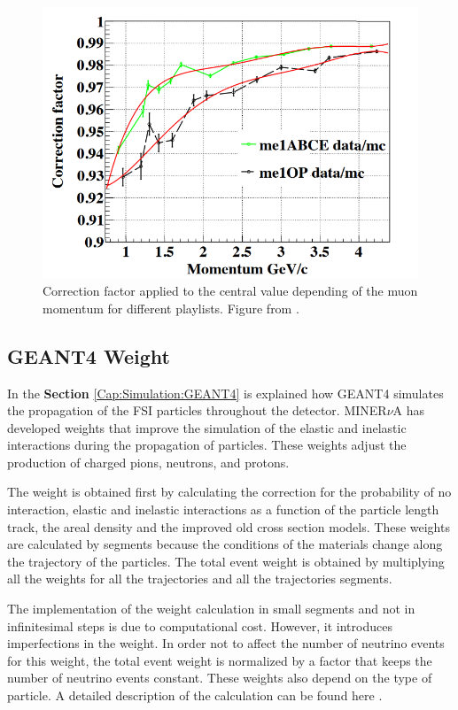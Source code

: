 \begin{figure}
    \centering
    \includegraphics[scale=0.4]{Figures/Chapter3/MINOSEfficiencyWeight.png}
    \caption{Correction factor applied to the central value depending of the muon momentum for different playlists. Figure from \cite{MINOSEffWeight}.}
    \label{fig:Chapter3:MINOSEfficiencyWeight}
\end{figure}

\subsection{GEANT4 Weight}
\label{Cap:Simulation:MnvGENIETunes:Geant4Weight}
In the \textbf{Section} \ref{Cap:Simulation:GEANT4} is explained how GEANT4 simulates the propagation of the FSI particles throughout the detector. MINER$\nu$A has developed weights that improve the simulation of the elastic and inelastic interactions during the propagation of particles. These weights adjust the production of charged pions, neutrons, and protons. 

The weight is obtained first by calculating the correction for the probability of no interaction, elastic and inelastic interactions as a function of the particle length track, the areal density and the improved old cross section models. These weights are calculated by segments because the conditions of the materials change along the trajectory of the particles. The total event weight is obtained by multiplying all the weights for all the trajectories and all the trajectories segments.  

The implementation of the weight calculation in small segments and not in infinitesimal steps is due to computational cost. However, it introduces imperfections in the weight. In order not to affect the number of neutrino events for this weight, the total event weight is normalized by a factor that keeps the number of neutrino events constant. These weights also depend on the type of particle. A detailed description of the calculation can be found here \cite{JeffreeThesis}.

